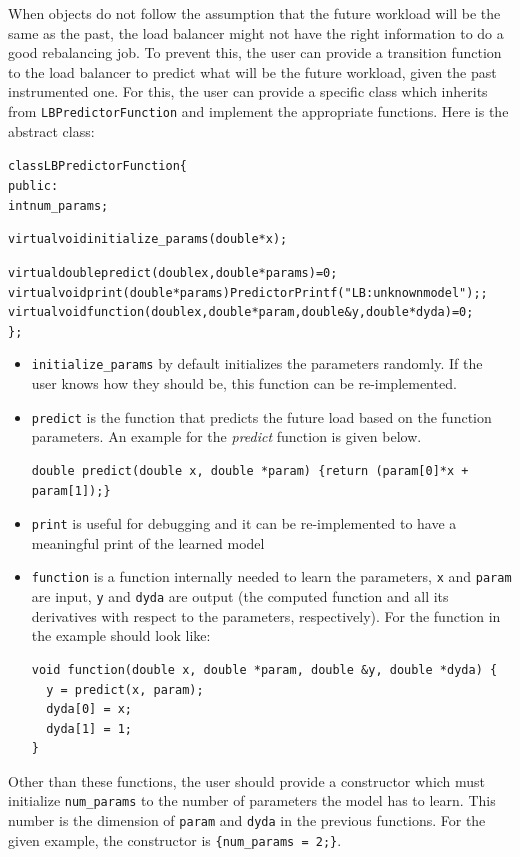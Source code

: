 When objects do not follow the assumption that the future workload will be the
same as the past, the load balancer might not have the right information to do
a good rebalancing job. To prevent this, the user can provide a transition
function to the load balancer to predict what will be the future workload, given
the past instrumented one. For this, the user can provide a specific class
which inherits from {\tt LBPredictorFunction} and implement the appropriate functions. 
Here is the abstract class:
\begin{alltt}
class LBPredictorFunction \{
public:
  int num_params;
 
  virtual void initialize_params(double *x);

  virtual double predict(double x, double *params) =0;
  virtual void print(double *params) {PredictorPrintf("LB: unknown model");};
  virtual void function(double x, double *param, double &y, double *dyda) =0;
\};
\end{alltt}
\begin{itemize}
\item {\tt initialize\_params} by default initializes the parameters randomly. If the user
knows how they should be, this function can be re-implemented.
\item {\tt predict} is the function that predicts the future load based on the function parameters.
An example for the {\em predict} function is given below.
\begin{verbatim}
double predict(double x, double *param) {return (param[0]*x + param[1]);}
\end{verbatim}
\item {\tt print} is useful for debugging and it can be re-implemented to have a meaningful
print of the learned model
\item {\tt function} is a function internally needed to learn the parameters, {\tt x} and
{\tt param} are input, {\tt y} and {\tt dyda} are output (the computed function and
all its derivatives with respect to the parameters, respectively).
For the function in the example should look like:
\begin{verbatim}
void function(double x, double *param, double &y, double *dyda) {
  y = predict(x, param);
  dyda[0] = x;
  dyda[1] = 1;
}
\end{verbatim}
\end{itemize}
Other than these functions, the user should provide a constructor which must initialize
{\tt num\_params} to the number of parameters the model has to learn. This number is
the dimension of {\tt param} and {\tt dyda} in the previous functions. For the given
example, the constructor is {\tt \{num\_params = 2;\}}.

